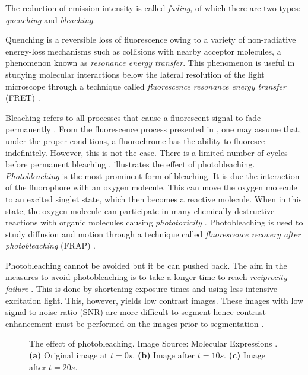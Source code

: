 \begin{definition}[Fading]
	The reduction of emission intensity is called \textit{fading}, of which there are two types: \textit{quenching} and \textit{bleaching}.
	
	Quenching is a reversible loss of fluorescence owing to a variety of non-radiative energy-loss mechanisms such as collisions with nearby acceptor molecules, a phenomenon known as \textit{resonance energy transfer}.
	This phenomenon is useful in studying molecular interactions below the lateral resolution of the light microscope through a technique called \textit{fluorescence resonance energy transfer} (FRET) \cite{Spring2003,Danek2012,LichtmanConchello2005}.
	
	Bleaching refers to all processes that cause a fluorescent signal to fade permanently \citep{LichtmanConchello2005}.
	From the fluorescence process presented in , one may assume that, under the proper conditions, a fluorochrome has the ability to fluoresce indefinitely.
	However, this is not the case. There is a limited number of cycles before permanent bleaching \citep{LichtmanConchello2005}.
	 illustrates the effect of photobleaching.
	\textit{Photobleaching} is the most prominent form of bleaching.
	It is due the interaction of the fluorophore with an oxygen molecule.
	This can move the oxygen molecule to an excited singlet state, which then becomes a reactive molecule.
	When in this state, the oxygen molecule can participate in many chemically destructive reactions with organic molecules causing \textit{phototoxicity} \citep{Danek2012}.
	Photobleaching is used to study diffusion and motion through a technique called \textit{fluorescence recovery after photobleaching} (FRAP) \citep{LichtmanConchello2005,AbramowitzDavidson2016}.
	
	Photobleaching cannot be avoided but it be can pushed back.
	The aim in the measures to avoid photobleaching is to take a longer time to reach \textit{reciprocity failure} \citep{AbramowitzDavidson2016}.
	This is done by shortening exposure times and using less intensive excitation light.
	This, however, yields low contrast images.
	These images with low signal-to-noise \citep{Murphy2001} ratio (SNR) are more difficult to segment hence contrast enhancement must be performed on the images prior to segmentation \citep{Boppart2005}.
	\begin{figure}[!t]
		\centering
		\caption{The effect of photobleaching. Image Source: Molecular Expressions \citep{MolecularExpressionsPhotobleaching}. 
			\textbf{(a)} Original image at $t=0s$.
			\textbf{(b)} Image after $t=10s$.
			\textbf{(c)} Image after $t=20s$.
			}
		\label{fig:bleaching}
	\end{figure}
\end{definition}

